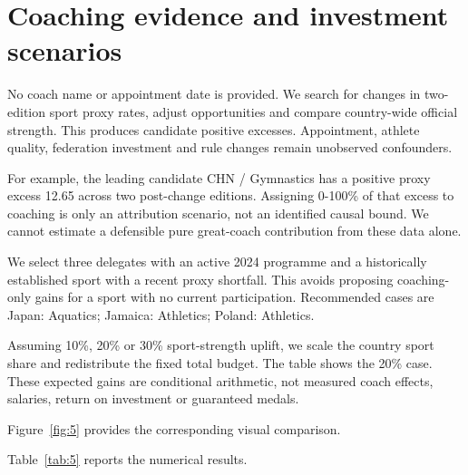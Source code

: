 \documentclass[11pt,a4paper]{article}
\begin{document}
\section{Coaching evidence and investment scenarios}
No coach name or appointment date is provided. We search for changes in two-edition sport proxy rates, adjust opportunities and compare country-wide official strength. This produces candidate positive excesses. Appointment, athlete quality, federation investment and rule changes remain unobserved confounders.

For example, the leading candidate CHN / Gymnastics has a positive proxy excess 12.65 across two post-change editions. Assigning 0-100\% of that excess to coaching is only an attribution scenario, not an identified causal bound. We cannot estimate a defensible pure great-coach contribution from these data alone.

We select three delegates with an active 2024 programme and a historically established sport with a recent proxy shortfall. This avoids proposing coaching-only gains for a sport with no current participation. Recommended cases are Japan: Aquatics; Jamaica: Athletics; Poland: Athletics.

Assuming 10\%, 20\% or 30\% sport-strength uplift, we scale the country sport share and redistribute the fixed total budget. The table shows the 20\% case. These expected gains are conditional arithmetic, not measured coach effects, salaries, return on investment or guaranteed medals.

Figure~\ref{fig:5} provides the corresponding visual comparison.

Table~\ref{tab:5} reports the numerical results.
\end{document}
